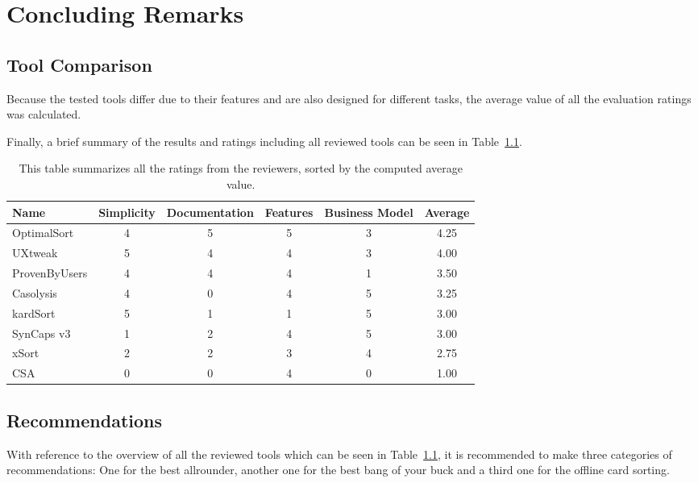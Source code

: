 \chapter{Concluding Remarks}

\label{chap:Concl}



\section{Tool Comparison}

Because the tested tools differ due to their features and are also designed for
different tasks, the average value of all the evaluation ratings was calculated. 

Finally, a brief summary of the results and ratings including all reviewed tools 
can be seen in Table~\ref{tab:tool-comparison}.




\begin{table}[tpb]
\centering
\begin{tabularx}
{\linewidth}{|X|c|c|c|c|c|}
\hline \textbf{Name} & \textbf{Simplicity} & \textbf{Documentation} & \textbf{Features} & \textbf{Business Model} & \textbf{Average}\\ 
\hline OptimalSort & 4 & 5 & 5 & 3 & 4.25 \\ 
\hline UXtweak & 5 & 4 & 4 & 3 & 4.00 \\ 
\hline ProvenByUsers & 4 & 4 & 4 & 1 & 3.50 \\ 
\hline Casolysis & 4 & 0 & 4 & 5 & 3.25 \\ 
\hline kardSort & 5 & 1 & 1 & 5 & 3.00 \\ 
\hline SynCaps v3 & 1 & 2 & 4 & 5 & 3.00 \\ 
\hline xSort & 2 & 2 & 3 & 4 & 2.75 \\ 
\hline CSA & 0 & 0 & 4 & 0 & 1.00 \\ 
\hline
\end{tabularx} 
\caption[Tool Comparison] 
{ 
This table summarizes all the ratings from the reviewers, sorted by the computed average value.
}
\label{tab:tool-comparison}
\end{table}




\section{Recommendations}

With reference to the overview of all the reviewed tools which can be seen 
in Table~\ref{tab:tool-comparison}, it is recommended to make three 
categories of recommendations: One for the best allrounder, another one 
for the best bang of your buck and a third one for the offline card sorting.

